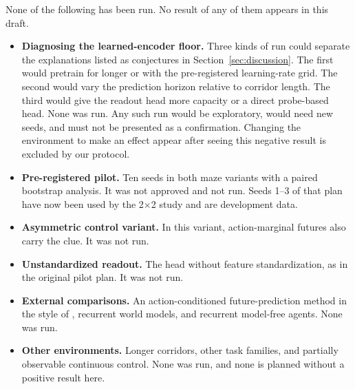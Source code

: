 None of the following has been run. No result of any of them appears in this draft.
\begin{itemize}
  \item \textbf{Diagnosing the learned-encoder floor.} Three kinds of run could separate the explanations listed as conjectures in Section~\ref{sec:discussion}. The first would pretrain for longer or with the pre-registered learning-rate grid. The second would vary the prediction horizon relative to corridor length. The third would give the readout head more capacity or a direct probe-based head. None was run. Any such run would be exploratory, would need new seeds, and must not be presented as a confirmation. Changing the environment to make an effect appear after seeing this negative result is excluded by our protocol.
  \item \textbf{Pre-registered pilot.} Ten seeds in both maze variants with a paired bootstrap analysis. It was not approved and not run. Seeds 1--3 of that plan have now been used by the 2$\times$2 study and are development data.
  \item \textbf{Asymmetric control variant.} In this variant, action-marginal futures also carry the clue. It was not run.
  \item \textbf{Unstandardized readout.} The head without feature standardization, as in the original pilot plan. It was not run.
  \item \textbf{External comparisons.} An action-conditioned future-prediction method in the style of \citet{kwon2024future}, recurrent world models, and recurrent model-free agents. None was run.
  \item \textbf{Other environments.} Longer corridors, other task families, and partially observable continuous control. None was run, and none is planned without a positive result here.
\end{itemize}
